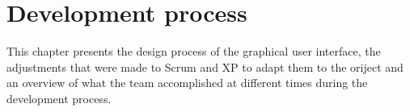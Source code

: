 \chapter{Development process}
\label{sec:devProcess}
This chapter presents the design process of the graphical user interface, the adjustments that were made to Scrum and XP to adapt them to the oriject and an overview of what the team accomplished at different times during the development process. 






